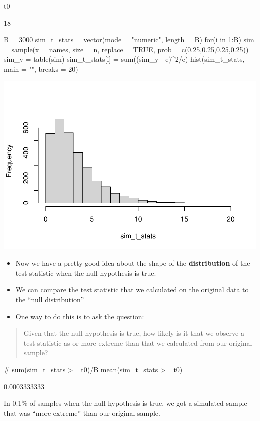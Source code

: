 \documentclass[a4paper]{article}
\begin{document}
\begin{Schunk}
\begin{Sinput}
t0
\end{Sinput}
\begin{Soutput}
[1] 18
\end{Soutput}
\end{Schunk}
\begin{Schunk}
\begin{Sinput}
B = 3000
sim_t_stats = vector(mode = "numeric", length = B)
for(i in 1:B){
  sim = sample(x = names, size = n,
  replace = TRUE, prob = c(0.25,0.25,0.25,0.25))
  sim_y = table(sim)
  sim_t_stats[i] = sum((sim_y - e)^2/e)
}
hist(sim_t_stats, main = "", breaks = 20)
\end{Sinput}


{\centering \includegraphics[width=\maxwidth]{figure/listings-unnamed-chunk-21-1} 

}

\end{Schunk}
\begin{itemize}
	\item Now we have a pretty good idea about the shape of the \textbf{distribution} of the test statistic \textcolor{mygreen}{when the null hypothesis is true}.
	\item We can compare the test statistic that we calculated on the original data to the \textcolor{mygreen}{``null distribution''}
	\item One way to do this is to ask the question:
\end{itemize}
\begin{quote}
	Given that the \textcolor{mygreen}{null hypothesis is true}, how likely is it that we observe a test statistic as or more extreme than that we calculated from our original sample?
\end{quote}
\begin{Schunk}
\begin{Sinput}
# sum(sim_t_stats >= t0)/B
mean(sim_t_stats >= t0)
\end{Sinput}
\begin{Soutput}
[1] 0.0003333333
\end{Soutput}
\end{Schunk}
In 0.1\% of samples when the null hypothesis is true, we got a simulated sample that was ``more extreme'' than our original sample.
\end{document}
